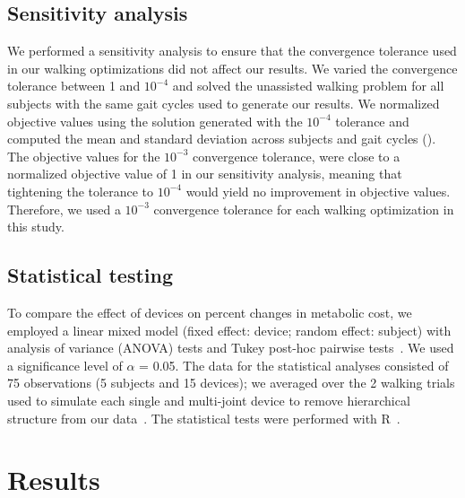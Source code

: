 \documentclass[10pt,letterpaper]{article}
\begin{document}
\subsection*{Sensitivity analysis}
We performed a sensitivity analysis to ensure that the convergence tolerance used in our walking optimizations did not affect our results. We varied the convergence tolerance between 1 and $10^{-4}$ and solved the unassisted walking problem for all subjects with the same gait cycles used to generate our results. We normalized objective values using the solution generated with the $10^{-4}$ tolerance and computed the mean and standard deviation across subjects and gait cycles (). The objective values for the $10^{-3}$ convergence tolerance, were close to a normalized objective value of 1 in our sensitivity analysis, meaning that tightening the tolerance to $10^{-4}$ would yield no improvement in objective values. Therefore, we used a $10^{-3}$ convergence tolerance for each walking optimization in this study.

\subsection*{Statistical testing}
To compare the effect of devices on percent changes in metabolic cost, we employed a linear mixed model (fixed effect: device; random effect: subject) with analysis of variance (ANOVA) tests and Tukey post-hoc pairwise tests~\cite{Bretz:2011}. We used a significance level of $\alpha$ = 0.05. The data for the statistical analyses consisted of 75 observations (5 subjects and 15 devices); we averaged over the 2 walking trials used to simulate each single and multi-joint device to remove hierarchical structure from our data~\cite{Samuels:1999}. The statistical tests were performed with R~\cite{CoreTeamR:2021, Bates:2015, Hothorn:2008}.

\section*{Results}
\end{document}
